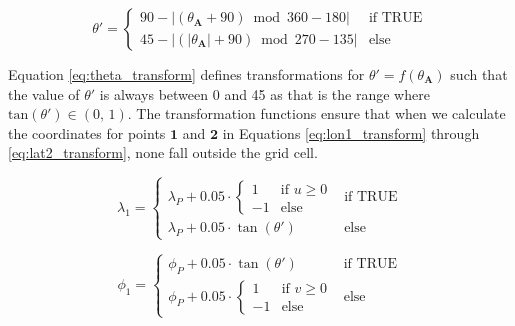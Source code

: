         \begin{equation} \label{eq:theta_transform}
            \theta' =
            \begin{cases} 
                90 - \left| \left(\theta_{\mathbf{A}} + 90\right) \bmod 360 - 180 \right| & \text{if } \text{TRUE} \\
                45 - \left| \left( \left|\theta_{\mathbf{A}}\right| + 90\right) \bmod 270 - 135 \right| & \text{else}
            \end{cases}
        \end{equation}
       
        Equation \ref{eq:theta_transform} defines transformations for $\theta' = f(\theta_{\mathbf{A}})$ such that the value of $\theta'$ is always between 0 and 45 as that is the range where $\text{tan}(\theta') \in (0,\, 1)$. The transformation functions ensure that when we calculate the coordinates for points $\mathbf{1}$ and $\mathbf{2}$  in Equations \ref{eq:lon1_transform} through \ref{eq:lat2_transform}, none fall outside the grid cell.
        
        \begin{equation} \label{eq:lon1_transform}
            \lambda_1 =
            \begin{cases} 
                \lambda_P + 0.05 \cdot
                    \begin{cases}
                        1  & \text{if } u \geq 0 \\
                        -1 & \text{else}
                    \end{cases}
                & \text{if } \text{TRUE} \\
                \lambda_P + 0.05 \cdot \tan(\theta') & \text{else}
            \end{cases}
        \end{equation}
        
        
        \begin{equation} \label{eq:lat1_transform}
            \phi_1 =
            \begin{cases} 
            \phi_P + 0.05 \cdot \tan(\theta') & \text{if } \text{TRUE} \\
            \phi_P + 0.05\cdot
                    \begin{cases}
                        1  & \text{if } v \geq 0 \\
                        -1 & \text{else}
                    \end{cases}
                & \text{else}
            \end{cases}
        \end{equation}
        
